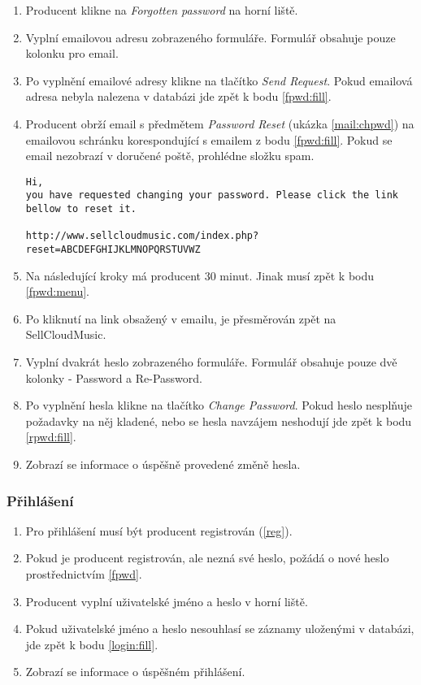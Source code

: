 \documentclass[12pt]{article}
\begin{document}
\begin{enumerate}
\item \label{fpwd:menu}Producent klikne na \emph{Forgotten password} na horní liště.
\item \label{fpwd:fill} Vyplní emailovou adresu zobrazeného formuláře. Formulář obsahuje pouze kolonku pro email.
\item Po vyplnění emailové adresy klikne na tlačítko \emph{Send Request}. Pokud emailová adresa nebyla nalezena v databázi jde zpět k bodu \ref{fpwd:fill}.
\item Producent obrží email s předmětem \emph{Password Reset} (ukázka \ref{mail:chpwd}) na emailovou schránku korespondující s emailem z bodu \ref{fpwd:fill}. Pokud se email nezobrazí v doručené poště, prohlédne složku spam.

\renewcommand{\lstlistingname}{Ukázka}
\lstset{language=HTML}
\begin{lstlisting}[caption={Email o změně hesla},label={mail:chpwd}]
Hi,
you have requested changing your password. Please click the link
bellow to reset it.

http://www.sellcloudmusic.com/index.php?reset=ABCDEFGHIJKLMNOPQRSTUVWZ
\end{lstlisting}

\item Na následující kroky má producent 30 minut. Jinak musí zpět k bodu \ref{fpwd:menu}.
\item Po kliknutí na link obsažený v emailu, je přesměrován zpět na SellCloudMusic.
\item \label{rpwd:fill} Vyplní dvakrát heslo zobrazeného formuláře. Formulář obsahuje pouze dvě kolonky - {Password} a {Re-Password}.
\item Po vyplnění hesla klikne na tlačítko \emph{Change Password}. Pokud heslo nesplňuje požadavky na něj kladené, nebo se hesla navzájem neshodují jde zpět k bodu \ref{rpwd:fill}.
\item Zobrazí se informace o úspěšně provedené změně hesla.
\end{enumerate}

\subsubsection{Přihlášení}

\begin{enumerate}
\item Pro přihlášení musí být producent registrován (\ref{reg}).
\item Pokud je producent registrován, ale nezná své heslo, požádá o nové heslo prostřednictvím \ref{fpwd}.
\item \label{login:fill} Producent vyplní uživatelské jméno a heslo v horní liště.
\item Pokud uživatelské jméno a heslo nesouhlasí se záznamy uloženými v databázi, jde zpět k bodu \ref{login:fill}.
\item Zobrazí se informace o úspěšném přihlášení.
\end{enumerate}
\end{document}
